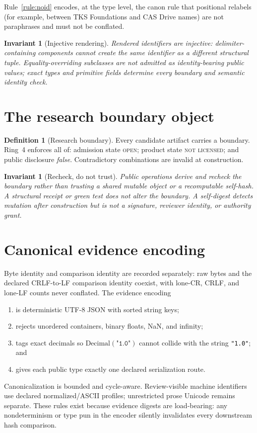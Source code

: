 \documentclass[11pt]{amsart}
\newtheorem{invariant}[theorem]{Invariant}
\theoremstyle{definition}
\newtheorem{definition}[theorem]{Definition}
\theoremstyle{remark}
\begin{document}
Rule~\ref{rule:noid} encodes, at the type level, the canon rule that positional relabels (for example, between TKS Foundations and CAS Drive names) are not paraphrases and must not be conflated.

\begin{invariant}[Injective rendering]
Rendered identifiers are injective: delimiter-containing components cannot create the same identifier as a different structural tuple. Equality-overriding subclasses are not admitted as identity-bearing public values; exact types and primitive fields determine every boundary and semantic identity check.
\end{invariant}

\section{The research boundary object}

\begin{definition}[Research boundary]\label{def:boundary}
Every candidate artifact carries a boundary. Ring~4 enforces all of: admission state \textsc{open}; product state \textsc{not licensed}; and public disclosure \emph{false}. Contradictory combinations are invalid at construction.
\end{definition}

\begin{invariant}[Recheck, do not trust]
Public operations derive and recheck the boundary rather than trusting a shared mutable object or a recomputable self-hash. A structural receipt or green test does not alter the boundary. A self-digest detects mutation after construction but is not a signature, reviewer identity, or authority grant.
\end{invariant}

\section{Canonical evidence encoding}

Byte identity and comparison identity are recorded separately: raw bytes and the declared CRLF-to-LF comparison identity coexist, with lone-CR, CRLF, and lone-LF counts never conflated. The evidence encoding
\begin{enumerate}
\item is deterministic UTF-8 JSON with sorted string keys;
\item rejects unordered containers, binary floats, NaN, and infinity;
\item tags exact decimals so $\mathrm{Decimal}(\texttt{"1.0"})$ cannot collide with the string \texttt{"1.0"}; and
\item gives each public type exactly one declared serialization route.
\end{enumerate}
Canonicalization is bounded and cycle-aware. Review-visible machine identifiers use declared normalized/ASCII profiles; unrestricted prose Unicode remains separate. These rules exist because evidence digests are load-bearing: any nondeterminism or type pun in the encoder silently invalidates every downstream hash comparison.
\end{document}
